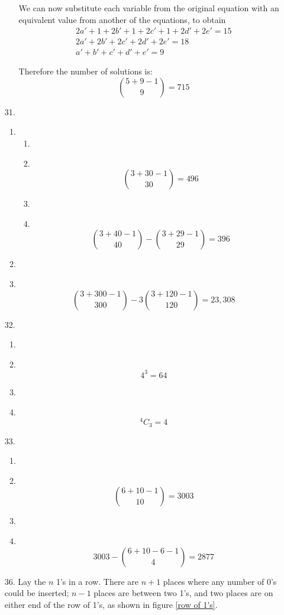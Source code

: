 \documentclass[fleqn]{article}
\newcommand\Item[1][]{ %
  \ifx\relax#1\relax  \item \else \item[#1] \fi
  \abovedisplayskip=0pt\abovedisplayshortskip=0pt~\vspace*{-\baselineskip}
}
\newcommand*{\comb}[2]{{}^{#1}C_{#2}}%
\begin{document}
\begin{enumerate}
\begin{enumerate}
		We can now substitute each variable from the original equation with an equivalent value from another of the equations, to obtain
		\begin{gather*}
			2a' + 1 + 2b' + 1 + 2c' + 1 + 2d' + 2e' = 15 \\
			2a' + 2b' + 2c' + 2d' + 2e' = 18 \\
			a' + b' + c' + d' + e' = 9
		\end{gather*}

		Therefore the number of solutions is:
		\[\binom{5 + 9 - 1}{9} = 715\]
	\end{enumerate}

	\bigskip
	\item[31.]
	\begin{enumerate}
		\item %
		\begin{enumerate}
			\Item %
			\[\binom{3 + 30 - 1}{30} = 496\]
			\Item %
			\[\binom{3 + 40 - 1}{40} - \binom{3 + 29 - 1}{29} = 396\]
		\end{enumerate}
		\Item %
		\[\binom{3 + 300 - 1}{300} - 3 \binom{3 + 120 - 1}{120} = 23,308\]
	\end{enumerate}

	\bigskip
	\item[32.]
	\begin{multicols}{2}
		\begin{enumerate}
			\Item %
			\[4^3 = 64\]
			\Item %
			\[\comb{4}{3} = 4\]
		\end{enumerate}
	\end{multicols}

	\bigskip
	\item[33.]
	\begin{multicols}{2}
		\begin{enumerate}
			\Item \[\binom{6 + 10 - 1}{10} = 3003\]
			\Item \[3003 - \binom{6 + 10 - 6 - 1}{4} = 2877\]
		\end{enumerate}
	\end{multicols}

	\item[36.]
	Lay the \(n\) 1's in a row. There are \(n + 1\) places where any number of 0's could be inserted; \(n - 1\) places are between two 1's, and two places are on either end of the row of 1's, as shown in figure \ref{row of 1's}.
	\begin{figure}[h]
		\centering
\end{figure}
\end{enumerate}
\end{document}
